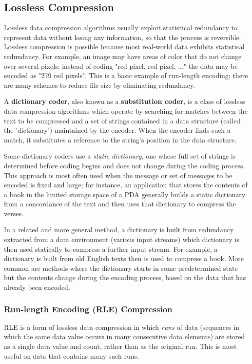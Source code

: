 \documentclass{article}
\begin{document}
  \subsection{Lossless Compression}
  Lossless data compression algorithms usually exploit statistical redundancy to represent data without losing any information, so that the process is reversible. Lossless compression is possible because most real-world data exhibits statistical redundancy. For example, an image may have areas of color that do not change over several pixels; instead of coding "red pixel, red pixel, ..." the data may be encoded as "279 red pixels". This is a basic example of run-length encoding; there are many schemes to reduce file size by eliminating redundancy.

  A \textbf{dictionary coder}, also known as a \textbf{substitution coder}, is a class of lossless data compression algorithms which operate by searching for matches between the text to be compressed and a set of strings contained in a data structure (called the 'dictionary') maintained by the encoder. When the encoder finds such a match, it substitutes a reference to the string's position in the data structure. 

  Some dictionary coders use a \textit{static dictionary}, one whose full set of strings is determined before coding begins and does not change during the coding process. This approach is most often used when the message or set of messages to be encoded is fixed and large; for instance, an application that stores the contents of a book in the limited storage space of a PDA generally builds a static dictionary from a concordance of the text and then uses that dictionary to compress the verses. 

  In a related and more general method, a dictionary is built from redundancy extracted from a data environment (various input streams) which dictionary is then used statically to compress a further input stream. For example, a dictionary is built from old English texts then is used to compress a book. More common are methods where the dictionary starts in some predetermined state but the contents change during the encoding process, based on the data that has already been encoded. 

  \subsubsection{Run-length Encoding (RLE) Compression}
  RLE is a form of lossless data compression in which \textit{runs} of data (sequences in which the same data value occurs in many consecutive data elements) are stored as a single data value and count, rather than as the original run. This is most useful on data that contains many such runs.
\end{document}
